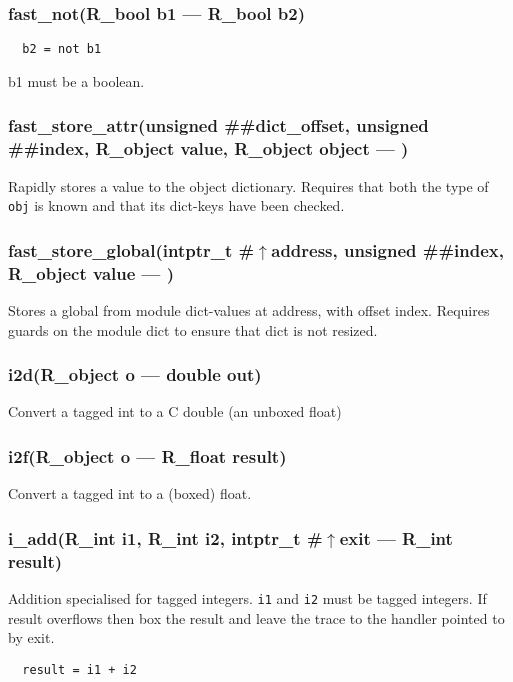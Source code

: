 \subsubsection{fast\_not(R\_bool b1 --- R\_bool b2)}
\vspace{-1em}\begin{verbatim}
  b2 = not b1
\end{verbatim}
\vspace{-1em}b1 must be a boolean. \vspace{-1em}
\subsubsection{fast\_store\_attr(unsigned \#\#dict\_offset, unsigned \#\#index, R\_object value, R\_object object --- )}
\vspace{-1em}Rapidly stores a value to the object dictionary. Requires that both the type of \texttt{obj} is known and that its dict-keys have been checked. \vspace{-1em}
\subsubsection{fast\_store\_global(intptr\_t \#$\uparrow$address, unsigned \#\#index, R\_object value --- )}
\vspace{-1em}Stores a global from module dict-values at address, with offset index. Requires guards on the module dict to ensure that dict is not resized. \vspace{-1em}
\subsubsection{i2d(R\_object o --- double out)}
\vspace{-1em}Convert a tagged int to a C double (an unboxed float) \vspace{-1em}
\subsubsection{i2f(R\_object o --- R\_float result)}
\vspace{-1em}Convert a tagged int to a (boxed) float. \vspace{-1em}
\subsubsection{i\_add(R\_int i1, R\_int i2, intptr\_t \#$\uparrow$exit --- R\_int result)}
\vspace{-1em}Addition specialised for tagged integers. \texttt{i1} and \texttt{i2} must be tagged integers. If result overflows then box the result and leave the trace to the handler pointed to by exit. \vspace{-1em}\begin{verbatim}
  result = i1 + i2
\end{verbatim}
\vspace{-1em}\vspace{-1em}
